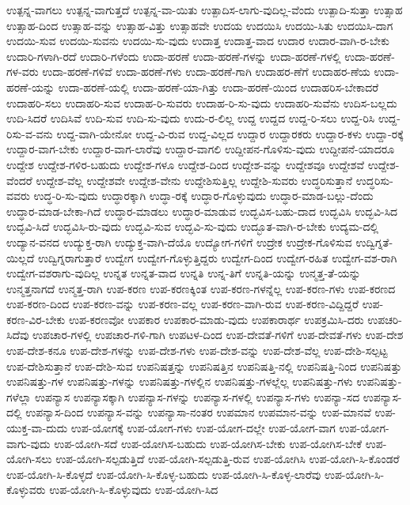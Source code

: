 {ಉತ್ಪನ್ನ-ವಾಗಲು
ಉತ್ಪನ್ನ-ವಾಗುತ್ತದೆ
ಉತ್ಪನ್ನ-ವಾ-ಯಿತು
ಉತ್ಪಾದಿಸ-ಲಾಗು-ವುದಿಲ್ಲ-ವೆಂದು
ಉತ್ಪಾದಿ-ಸುತ್ತಾ
ಉತ್ಸಾಹ
ಉತ್ಸಾಹ-ದಿಂದ
ಉತ್ಸಾಹ-ವನ್ನು
ಉತ್ಸಾಹ-ವಿತ್ತು
ಉತ್ಸಾಹವೇ
ಉದಯ
ಉದಯಿಸಿ
ಉದಯಿ-ಸಿತು
ಉದಯಿಸಿ-ದಾಗ
ಉದಯಿ-ಸುವ
ಉದಯಿ-ಸುವನು
ಉದಯಿ-ಸು-ವುದು
ಉದಾತ್ತ
ಉದಾತ್ತ-ವಾದ
ಉದಾರ
ಉದಾರ-ವಾಗಿ-ರ-ಬೇಕು
ಉದಾರಿ-ಗಳಾಗಿ-ರದೆ
ಉದಾರಿ-ಗಳೆಂದು
ಉದಾ-ಹರಣೆ
ಉದಾ-ಹರಣೆ-ಗಳನ್ನು
ಉದಾ-ಹರಣೆ-ಗಳಲ್ಲಿ
ಉದಾ-ಹರಣೆ-ಗಳ-ವರು
ಉದಾ-ಹರಣೆ-ಗಳಿವೆ
ಉದಾ-ಹರಣೆ-ಗಳು
ಉದಾ-ಹರಣೆ-ಗಾಗಿ
ಉದಾಹರ-ಣೆಗೆ
ಉದಾಹರ-ಣೆಯ
ಉದಾ-ಹರಣೆ-ಯನ್ನು
ಉದಾ-ಹರಣೆ-ಯಲ್ಲಿ
ಉದಾ-ಹರಣೆ-ಯಾ-ಗಿತ್ತು
ಉದಾ-ಹರಣೆ-ಯಿಂದ
ಉದಾಹರಿಸ-ಬೇಕಾದರೆ
ಉದಾಹರಿ-ಸಲು
ಉದಾಹರಿ-ಸುವ
ಉದಾಹ-ರಿ-ಸುವರು
ಉದಾಹ-ರಿ-ಸು-ವುದು
ಉದಾಹರಿ-ಸುವೆನು
ಉದಿಸ-ಬಲ್ಲದು
ಉದಿ-ಸಿದರೆ
ಉದಿಸಿವೆ
ಉದಿ-ಸುವ
ಉದಿ-ಸು-ವುದು
ಉದು-ರ-ಲಿಲ್ಲ
ಉದ್ದ
ಉದ್ದದ
ಉದ್ದ-ರಿ-ಸಲು
ಉದ್ದ-ರಿಸಿ
ಉದ್ದ-ರಿಸು-ವ-ವನು
ಉದ್ದ-ವಾಗಿ-ಯೇನೋ
ಉದ್ದ-ವಿ-ರುವ
ಉದ್ದ-ವಿಲ್ಲದ
ಉದ್ದಾರ
ಉದ್ದಾರಕರು
ಉದ್ದಾರ-ಕಳು
ಉದ್ದಾ-ರಕ್ಕೆ
ಉದ್ದಾರ-ವಾಗ-ಬೇಕು
ಉದ್ದಾರ-ವಾಗ-ಲಾರೆವು
ಉದ್ದಾರ-ವಾಗಲಿ
ಉದ್ದೀಪನ-ಗೊಳಿಸು-ವುದು
ಉದ್ದೀಪನೆ-ಯಾದರೂ
ಉದ್ದೇಶ
ಉದ್ದೇಶ-ಗಳಿರ-ಬಹುದು
ಉದ್ದೇಶ-ಗಳೂ
ಉದ್ದೇಶ-ದಿಂದ
ಉದ್ದೇಶ-ವನ್ನು
ಉದ್ದೇಶವೂ
ಉದ್ದೇಶವೆ
ಉದ್ದೇಶ-ವೆಂದರೆ
ಉದ್ದೇಶ-ವೆಲ್ಲ
ಉದ್ದೇಶವೇ
ಉದ್ದೇಶ-ವೇನು
ಉದ್ದೇಶಿಸುತ್ತಿಲ್ಲ
ಉದ್ದೇಶಿ-ಸುವರು
ಉದ್ಧರಿಸುತ್ತಾನೆ
ಉದ್ಧರಿಸು-ವವರು
ಉದ್ಧ-ರಿ-ಸು-ವುದು
ಉದ್ಧಾರಕ್ಕಾಗಿ
ಉದ್ಧಾ-ರಕ್ಕೆ
ಉದ್ಧಾರ-ಗೊಳ್ಳುವುದು
ಉದ್ಧಾರ-ಮಾಡ-ಬಲ್ಲು-ದೆಂದು
ಉದ್ಧಾರ-ಮಾಡ-ಬೇಕಾ-ಗಿದೆ
ಉದ್ಧಾರ-ಮಾಡಲು
ಉದ್ಧಾರ-ಮಾಡುವ
ಉದ್ಭವಿಸ-ಬಹು-ದಾದ
ಉದ್ಭವಿಸಿ
ಉದ್ಭವಿ-ಸಿದ
ಉದ್ಭವಿ-ಸಿದೆ
ಉದ್ಭವಿಸಿ-ರು-ವುದು
ಉದ್ಭವಿ-ಸುವ
ಉದ್ಭವಿ-ಸು-ವುದು
ಉದ್ಭೂತ-ವಾಗಿ-ರ-ಬೇಕು
ಉದ್ಯಮ-ದಲ್ಲಿ
ಉದ್ಯಾನ-ವನದ
ಉದ್ಯುಕ್ತ-ರಾಗಿ
ಉದ್ಯುಕ್ತ-ವಾಗಿ-ದೆಯೊ
ಉದ್ಯೋಗ-ಗಳಿಗೆ
ಉದ್ರೇಕ
ಉದ್ರೇಕ-ಗೊಳಿಸುವ
ಉದ್ವಿಗ್ನತೆ-ಯಿಲ್ಲದೆ
ಉದ್ವಿಗ್ನರಾಗುತ್ತಾರೆ
ಉದ್ವೇಗ
ಉದ್ವೇಗ-ಗೊಳ್ಳುತ್ತಿದ್ದರು
ಉದ್ವೇಗ-ದಿಂದ
ಉದ್ವೇಗ-ರಹಿತ
ಉದ್ವೇಗ-ವಶ-ರಾಗಿ
ಉದ್ವೇಗ-ವಶರಾಗು-ವುದಿಲ್ಲ
ಉನ್ನತ
ಉನ್ನತ-ವಾದ
ಉನ್ನತಿ
ಉನ್ನ-ತಿಗೆ
ಉನ್ನತಿ-ಯನ್ನು
ಉನ್ಮತ್ತ-ತೆ-ಯನ್ನು
ಉನ್ಮತ್ತನಾಗದೆ
ಉನ್ಮತ್ತ-ರಾಗಿ
ಉಪ-ಕರಣ
ಉಪ-ಕರಣಕ್ಕಿಂತ
ಉಪ-ಕರಣ-ಗಳನ್ನೆಲ್ಲ
ಉಪ-ಕರಣ-ಗಳು
ಉಪ-ಕರಣದ
ಉಪ-ಕರಣ-ದಿಂದ
ಉಪ-ಕರಣ-ವನ್ನು
ಉಪ-ಕರಣ-ವಲ್ಲ
ಉಪ-ಕರಣ-ವಾಗಿ-ರುವ
ಉಪ-ಕರಣ-ವಿದ್ದಿದ್ದರೆ
ಉಪ-ಕರಣ-ವಿರ-ಬೇಕು
ಉಪ-ಕರಣವೋ
ಉಪಕಾರ
ಉಪಕಾರ-ಮಾಡು-ವುದು
ಉಪಕಾರಾರ್ಥ
ಉಪಕ್ರಮಿಸಿ-ದರು
ಉಪಚರಿ-ಸಿದೆವು
ಉಪಚಾರ-ಗಳಲ್ಲಿ
ಉಪಚಾರ-ಗಳಿ-ಗಾಗಿ
ಉಪಟಳ-ದಿಂದ
ಉಪ-ದೇವತೆ-ಗಳಿಗೆ
ಉಪ-ದೇವತೆ-ಗಳು
ಉಪ-ದೇಶ
ಉಪ-ದೇಶ-ಕನೂ
ಉಪ-ದೇಶ-ಗಳನ್ನು
ಉಪ-ದೇಶ-ಗಳು
ಉಪ-ದೇಶ-ವನ್ನು
ಉಪ-ದೇಶ-ವೆಲ್ಲ
ಉಪ-ದೇಶಿ-ಸಲ್ಪಟ್ಟ
ಉಪ-ದೇಶಿಸುತ್ತಾನೆ
ಉಪ-ದೇಶಿ-ಸುವ
ಉಪನಿಷತ್ತನ್ನು
ಉಪನಿಷತ್ತಿನ
ಉಪನಿಷತ್ತಿ-ನಲ್ಲಿ
ಉಪನಿಷತ್ತಿ-ನಿಂದ
ಉಪನಿಷತ್ತು
ಉಪನಿಷತ್ತು-ಗಳ
ಉಪನಿಷತ್ತು-ಗಳನ್ನು
ಉಪನಿಷತ್ತು-ಗಳಲ್ಲಿನ
ಉಪನಿಷತ್ತು-ಗಳಲ್ಲೆಲ್ಲ
ಉಪನಿಷತ್ತು-ಗಳು
ಉಪನಿಷತ್ತು-ಗಳೆಲ್ಲಾ
ಉಪನ್ಯಾಸ
ಉಪನ್ಯಾಸಕ್ಕಾಗಿ
ಉಪನ್ಯಾಸ-ಗಳನ್ನು
ಉಪನ್ಯಾಸ-ಗಳಲ್ಲಿ
ಉಪನ್ಯಾಸ-ಗಳು
ಉಪನ್ಯಾ-ಸದ
ಉಪನ್ಯಾಸ-ದಲ್ಲಿ
ಉಪನ್ಯಾಸ-ದಿಂದ
ಉಪನ್ಯಾಸ-ವನ್ನು
ಉಪನ್ಯಾಸಾ-ನಂತರ
ಉಪಮಾನ
ಉಪಮಾನ-ವನ್ನು
ಉಪ-ಮಾನವೆ
ಉಪ-ಯುಕ್ತ-ವಾ-ದುದು
ಉಪ-ಯೋಗಕ್ಕೆ
ಉಪ-ಯೋಗ-ಗಳು
ಉಪ-ಯೋಗ-ದಲ್ಲೇ
ಉಪ-ಯೋಗ-ವಾಗ
ಉಪ-ಯೋಗ-ವಾಗು-ವುದು
ಉಪ-ಯೋಗಿ-ಸದೆ
ಉಪ-ಯೋಗಿಸ-ಬಹುದು
ಉಪ-ಯೋಗಿಸ-ಬೇಕು
ಉಪ-ಯೋಗಿಸ-ಬೇಕೆ
ಉಪ-ಯೋಗಿ-ಸಲು
ಉಪ-ಯೋಗಿ-ಸಲ್ಪಡುತ್ತಿದೆ
ಉಪ-ಯೋಗಿ-ಸಲ್ಪಡುತ್ತಿ-ರುವ
ಉಪ-ಯೋಗಿಸಿ
ಉಪ-ಯೋಗಿ-ಸಿ-ಕೊಂಡರೆ
ಉಪ-ಯೋಗಿ-ಸಿ-ಕೊಳ್ಳದೆ
ಉಪ-ಯೋಗಿ-ಸಿ-ಕೊಳ್ಳ-ಬಹುದು
ಉಪ-ಯೋಗಿ-ಸಿ-ಕೊಳ್ಳ-ಲಾರೆವು
ಉಪ-ಯೋಗಿ-ಸಿ-ಕೊಳ್ಳುವರು
ಉಪ-ಯೋಗಿ-ಸಿ-ಕೊಳ್ಳುವುದು
ಉಪ-ಯೋಗಿ-ಸಿದ
}
